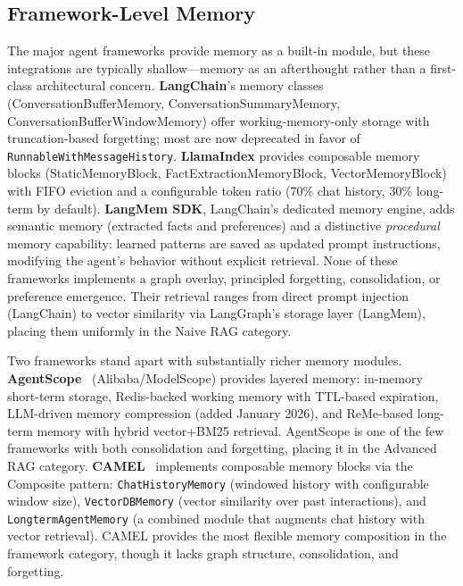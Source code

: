 \subsection{Framework-Level Memory}
\label{sec:framework}

The major agent frameworks provide memory as a built-in module, but
these integrations are typically shallow---memory as an afterthought
rather than a first-class architectural concern. \textbf{LangChain}'s
memory classes (ConversationBufferMemory, ConversationSummaryMemory,
ConversationBufferWindowMemory) offer working-memory-only storage with
truncation-based forgetting; most are now deprecated in favor of
\texttt{RunnableWithMessageHistory}. \textbf{LlamaIndex} provides
composable memory blocks (StaticMemoryBlock,
FactExtractionMemoryBlock, VectorMemoryBlock) with FIFO eviction and
a configurable token ratio (70\% chat history, 30\% long-term by
default). \textbf{LangMem SDK}, LangChain's dedicated memory engine,
adds semantic memory (extracted facts and preferences) and a
distinctive \emph{procedural} memory capability: learned patterns are
saved as updated prompt instructions, modifying the agent's behavior
without explicit retrieval. None of these frameworks implements a
graph overlay, principled forgetting, consolidation, or preference
emergence. Their retrieval ranges from direct prompt injection
(LangChain) to vector similarity via LangGraph's storage layer
(LangMem), placing them uniformly in the Naive RAG category.

Two frameworks stand apart with substantially richer memory modules.
\textbf{AgentScope}~\cite{agentscope2025} (Alibaba/ModelScope) provides
layered memory: in-memory short-term storage, Redis-backed working memory
with TTL-based expiration, LLM-driven memory compression (added January
2026), and ReMe-based long-term memory with hybrid vector+BM25 retrieval.
AgentScope is one of the few frameworks with both consolidation and
forgetting, placing it in the Advanced RAG category.
\textbf{CAMEL}~\cite{camel2025} implements composable memory blocks via
the Composite pattern: \texttt{ChatHistoryMemory} (windowed history with
configurable window size), \texttt{VectorDBMemory} (vector similarity
over past interactions), and \texttt{LongtermAgentMemory} (a combined
module that augments chat history with vector retrieval).  CAMEL provides
the most flexible memory composition in the framework category, though
it lacks graph structure, consolidation, and forgetting.

